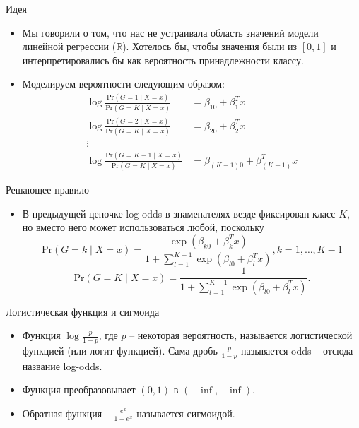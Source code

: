 \documentclass[9pt]{beamer}
\begin{document}
\begin{frame}{Идея}
\begin{itemize}
    \item Мы говорили о том, что нас не устраивала область значений модели линейной регрессии ($\mathbb{R}$). Хотелось бы, чтобы значения были из $[0, 1]$ и интерпретировались бы как вероятность принадлежности классу.
    \item Моделируем вероятности следующим образом:
    \begin{align*}
    \log \frac{\text{Pr}(G=1 \;|\; X = x)}{\text{Pr}(G=K \;|\; X = x)} &= \beta_{10} + \beta_1^Tx\\
    \log \frac{\text{Pr}(G=2 \;|\; X = x)}{\text{Pr}(G=K \;|\; X = x)} &= \beta_{20} + \beta_2^Tx\\
    \vdots& \\
    \log \frac{\text{Pr}(G=K-1 \;|\; X = x)}{\text{Pr}(G=K \;|\; X = x)} &= \beta_{(K-1)0} + \beta_{(K-1)}^Tx
    \end{align*}
\end{itemize}
\end{frame}

\begin{frame}{Решающее правило}
\begin{itemize}
    \item В предыдущей цепочке log-odds в знаменателях везде фиксирован класс $K$, но вместо него может использоваться любой, поскольку
    $$\text{Pr}(G=k\;|\; X=x) = \frac{\exp (\beta_{k0} + \beta_k^Tx)}{1+\sum_{l=1}^{K-1}\exp ( \beta_{l0} + \beta_l^Tx)}, k=1,\ldots, K-1$$
    $$\text{Pr}(G=K\;|\; X=x) = \frac{1}{1+\sum_{l=1}^{K-1}\exp(\beta_{l0} + \beta_l^Tx)}.$$
\end{itemize}
\end{frame}

\begin{frame}{Логистическая функция и сигмоида}
\begin{itemize}
    \item Функция $\log \frac{p}{1-p}$, где $p$ -- некоторая вероятность, называется логистической функцией (или логит-функцией). Сама дробь $\frac{p}{1-p}$ называется odds -- отсюда название log-odds.
    \item Функция преобразовывает $(0, 1)$ в $(-\inf, +\inf)$.
    \item Обратная функция -- $\frac{e^x}{1+e^x}$ называется сигмоидой.
\end{itemize}
\end{frame}
\end{document}
